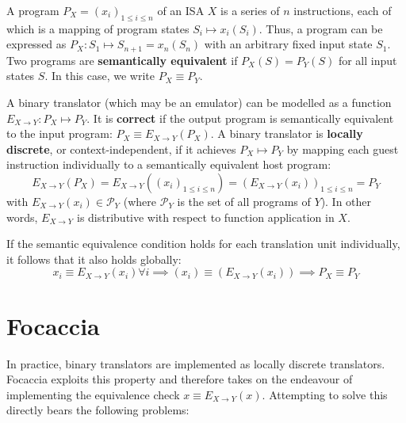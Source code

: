 A program $P_X = (x_i)_{1 \leq i \leq n}$ of an \ac{ISA} $X$ is a series of $n$ instructions, each of which is a mapping
of program states $S_i \mapsto x_i(S_i)$. Thus, a program can be expressed as
    $P_X : S_1 \mapsto S_{n+1} = x_n(S_n)$
with an arbitrary fixed input state $S_1$. Two programs are \textbf{semantically equivalent} if $P_X(S) = P_Y(S)$ for
all input states $S$. In this case, we write $P_X \equiv P_Y$.

A binary translator (which may be an emulator) can be modelled as a function $E_{X \rightarrow Y}: P_X \mapsto P_Y$. It
is \textbf{correct} if the output program is semantically equivalent to the input program:
    $P_X \equiv E_{X \rightarrow Y}(P_X)$.
A binary translator is \textbf{locally discrete}, or context-independent, if it achieves $P_X \mapsto P_Y$ by mapping
each guest instruction individually to a semantically equivalent host program:
\begin{equation}\label{sem_eq}
    E_{X\rightarrow Y}(P_X) = E_{X \rightarrow Y}((x_i)_{1 \leq i \leq n}) = (E_{X \rightarrow Y}(x_i))_{1 \leq i \leq n} = P_Y
\end{equation}
with $E_{X\rightarrow Y}(x_i) \in \mathcal{P}_Y$ (where $\mathcal{P}_Y$ is the set of all programs of $Y$). In other
words, $E_{X\rightarrow Y}$ is distributive with respect to function application in $X$.

If the semantic equivalence condition holds for each translation unit individually, it follows that it also holds globally:
\begin{equation}\label{eq:local_to_global_discreteness}
    x_i \equiv E_{X\rightarrow Y}(x_i) \forall i \implies (x_i) \equiv (E_{X\rightarrow Y}(x_i)) \implies P_X \equiv P_Y
\end{equation}

\section{Focaccia}\label{sec:intro:focaccia}

In practice, binary translators are implemented as locally discrete translators. Focaccia exploits this property and
therefore takes on the endeavour of implementing the equivalence check $x \equiv E_{X \rightarrow Y}(x)$. Attempting to
solve this directly bears the following problems:

